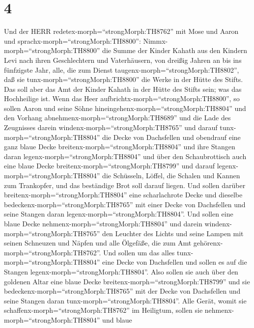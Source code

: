 \hypertarget{section-3}{%
\section{4}\label{section-3}}

 Und der HERR redetex-morph=``strongMorph:TH8762'' mit Mose
und Aaron und sprachx-morph=``strongMorph:TH8800'': 
Nimmx-morph=``strongMorph:TH8800'' die Summe der Kinder Kahath aus den
Kindern Levi nach ihren Geschlechtern und Vaterhäusern,  von
dreißig Jahren an bis ins fünfzigste Jahr, alle, die zum Dienst
taugenx-morph=``strongMorph:TH8802'', daß sie
tunx-morph=``strongMorph:TH8800'' die Werke in der Hütte des Stifts.
 Das soll aber das Amt der Kinder Kahath in der Hütte des
Stifts sein; was das Hochheilige ist.  Wenn das Heer
aufbrichtx-morph=``strongMorph:TH8800'', so sollen Aaron und seine Söhne
hineingehenx-morph=``strongMorph:TH8804'' und den Vorhang
abnehmenx-morph=``strongMorph:TH8689'' und die Lade des Zeugnisses
darein windenx-morph=``strongMorph:TH8765''  und darauf
tunx-morph=``strongMorph:TH8804'' die Decke von Dachsfellen und
obendrauf eine ganz blaue Decke breitenx-morph=``strongMorph:TH8804''
und ihre Stangen daran legenx-morph=``strongMorph:TH8804'' 
und über den Schaubrottisch auch eine blaue Decke
breitenx-morph=``strongMorph:TH8799'' und darauf
legenx-morph=``strongMorph:TH8804'' die Schüsseln, Löffel, die Schalen
und Kannen zum Trankopfer, und das beständige Brot soll darauf liegen.
 Und sollen darüber breitenx-morph=``strongMorph:TH8804''
eine scharlachrote Decke und dieselbe
bedeckenx-morph=``strongMorph:TH8765'' mit einer Decke von Dachsfellen
und seine Stangen daran legenx-morph=``strongMorph:TH8804''.
 Und sollen eine blaue Decke
nehmenx-morph=``strongMorph:TH8804'' und darein
windenx-morph=``strongMorph:TH8765'' den Leuchter des Lichts und seine
Lampen mit seinen Schneuzen und Näpfen und alle Ölgefäße, die zum Amt
gehörenx-morph=``strongMorph:TH8762''.  Und sollen um das
alles tunx-morph=``strongMorph:TH8804'' eine Decke von Dachsfellen und
sollen es auf die Stangen legenx-morph=``strongMorph:TH8804''.
 Also sollen sie auch über den goldenen Altar eine blaue
Decke breitenx-morph=``strongMorph:TH8799'' und sie
bedeckenx-morph=``strongMorph:TH8765'' mit der Decke von Dachsfellen und
seine Stangen daran tunx-morph=``strongMorph:TH8804''. 
Alle Gerät, womit sie schaffenx-morph=``strongMorph:TH8762'' im
Heiligtum, sollen sie nehmenx-morph=``strongMorph:TH8804'' und blaue
